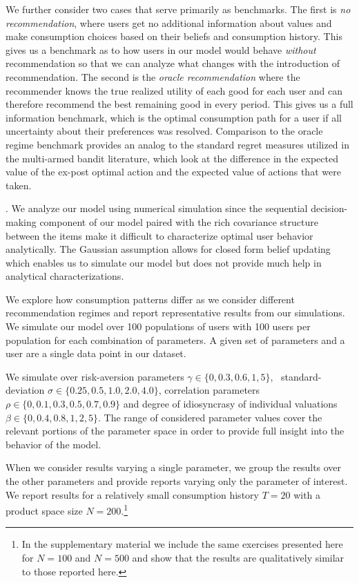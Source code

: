 \documentclass[format=acmsmall, review=false]{acmart}
\newcommand{\xhdr}[1]{\vspace{1mm} \noindent{\bf #1}}
\begin{document}
We further consider two cases that serve primarily as benchmarks. The first is \textit{no recommendation}, where users get no additional information about values and make consumption choices based on their beliefs and consumption history. This gives us a benchmark as to how users in our model would behave \textit{without} recommendation so that we can analyze what changes with the introduction of recommendation. The second is the \textit{oracle recommendation} where the recommender knows the true realized utility of each good for each user and can therefore recommend the best remaining good in every period. This gives us a full information benchmark, which is the optimal consumption path for a user if all uncertainty about their preferences was resolved. Comparison to the oracle regime benchmark provides an analog to the standard regret measures utilized in the multi-armed bandit literature, which look at the difference in the expected value of the ex-post optimal action and the expected value of actions that were taken.
\par

\xhdr{Simulation Details}. 
We analyze our model using numerical simulation since the sequential decision-making component of our model paired with the rich covariance structure between the items make it difficult to characterize optimal user behavior analytically. The Gaussian assumption allows for closed form belief updating which enables us to simulate our model but does not provide much help in analytical characterizations. 
\par

We explore how consumption patterns differ as we consider different recommendation regimes and report representative results from our simulations. We simulate our model over 100 populations of users with 100 users per population for each combination of parameters. 
A given set of parameters and a user are a single data point in our dataset.
\par

We simulate over risk-aversion parameters $\gamma \in \{ 0, 0.3, 0.6, 1, 5 \}$, \ standard-deviation $\sigma \in \{ 0.25, 0.5, 1.0, 2.0, 4.0 \}$, correlation parameters $\rho\in \{ 0, 0.1, 0.3, 0.5, 0.7, 0.9 \} $ and degree of idiosyncrasy of individual valuations $\beta \in \{ 0, 0.4, 0.8, 1, 2, 5\}$. The range of considered parameter values cover the relevant portions of the parameter space in order to provide full insight into the behavior of the model. 
\par
When we consider results varying a single parameter, we group the results over the other parameters and provide reports varying only the parameter of interest. We report results for a relatively small consumption history $T=20$ with a product space size $N=200$.\footnote{In the supplementary material we include the same exercises presented here for $N = 100$ and $N = 500$ and show that the results are qualitatively similar to those reported here.}
\par
\end{document}
